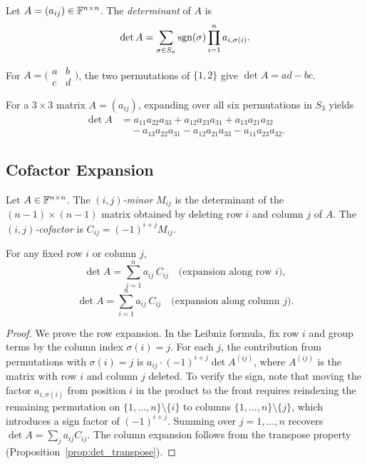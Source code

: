 \documentclass[11pt,a4paper]{article}
\begin{document}
\begin{definition}
\label{def:det_leibniz}
Let $A = (a_{ij}) \in \mathbb{F}^{n \times n}$.  The \emph{determinant} of $A$ is
\[
  \det A = \sum_{\sigma \in S_n} \operatorname{sgn}(\sigma) \prod_{i=1}^{n} a_{i,\sigma(i)}.
\]
\end{definition}

\begin{example}
\label{ex:det_small}
For $A = \bigl(\begin{smallmatrix} a & b \\ c & d \end{smallmatrix}\bigr)$,
the two permutations of $\{1,2\}$ give
$\det A = ad - bc$.

For a $3 \times 3$ matrix $A = (a_{ij})$, expanding over all six
permutations in $S_3$ yields
\begin{align*}
  \det A &= a_{11}a_{22}a_{33} + a_{12}a_{23}a_{31} + a_{13}a_{21}a_{32} \\
         &\quad - a_{13}a_{22}a_{31} - a_{12}a_{21}a_{33} - a_{11}a_{23}a_{32}.
\end{align*}
\end{example}

\subsection{Cofactor Expansion}

\begin{definition}
\label{def:minor_cofactor}
Let $A \in \mathbb{F}^{n \times n}$.  The \emph{$(i,j)$-minor} $M_{ij}$ is the
determinant of the $(n-1) \times (n-1)$ matrix obtained by deleting row $i$
and column $j$ of $A$.  The \emph{$(i,j)$-cofactor} is
$C_{ij} = (-1)^{i+j} M_{ij}$.
\end{definition}

\begin{theorem}
\label{thm:cofactor_expansion}
For any fixed row $i$ or column $j$,
\[
  \det A = \sum_{j=1}^{n} a_{ij}\, C_{ij}
  \quad \text{(expansion along row $i$)},
\]
\[
  \det A = \sum_{i=1}^{n} a_{ij}\, C_{ij}
  \quad \text{(expansion along column $j$)}.
\]
\end{theorem}

\begin{proof}
We prove the row expansion.  In the Leibniz formula, fix row $i$ and
group terms by the column index $\sigma(i) = j$.  For each $j$, the
contribution from permutations with $\sigma(i) = j$ is
$a_{ij} \cdot (-1)^{i+j} \det A^{(ij)}$, where $A^{(ij)}$ is the matrix
with row $i$ and column $j$ deleted.  To verify the sign, note that
moving the factor $a_{i,\sigma(i)}$ from position $i$ in the product
to the front requires reindexing the remaining permutation on
$\{1,\ldots,n\} \setminus \{i\}$ to columns
$\{1,\ldots,n\} \setminus \{j\}$, which introduces a sign factor of
$(-1)^{i+j}$.  Summing over $j = 1, \ldots, n$ recovers
$\det A = \sum_j a_{ij} C_{ij}$.  The column expansion follows from
the transpose property (Proposition~\ref{prop:det_transpose}).
\end{proof}
\end{document}
